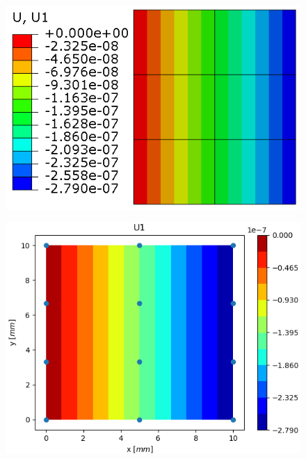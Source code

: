 \documentclass[11pt]{article}
\begin{document}
\begin{figure}[H]
	\centering
	\begin{minipage}{.5\textwidth}
		\centering
		\includegraphics[width=1\linewidth]{EME23U1.png}
		\label{EME23U1}
	\end{minipage}%
	\begin{minipage}{.5\textwidth}
		\centering
		\includegraphics[width=1\linewidth]{EME23U1_IGA.png}
		\label{EME23U1_IGA}
	\end{minipage}
\end{figure}
\end{document}
